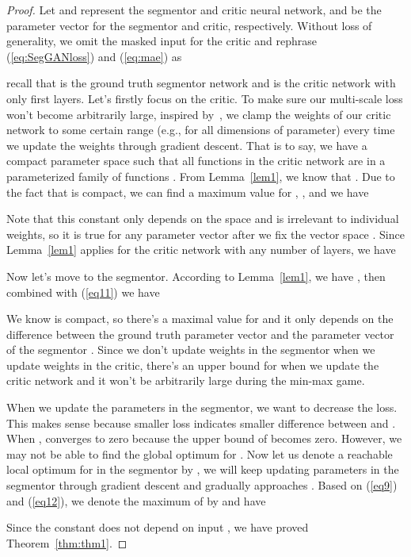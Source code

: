 \documentclass[twocolumn]{svjour3}
\begin{document}
\begin{proof}
Let  and  represent the segmentor and critic neural network,  and  be the parameter vector for the segmentor and critic, respectively. Without loss of generality, we omit the masked input for the critic and rephrase (\ref{eq:SegGANloss}) and (\ref{eq:mae}) as

recall that  is the ground truth segmentor network and  is the critic network with only first  layers. Let's firstly focus on the critic. To make sure our multi-scale loss won't become arbitrarily large, inspired by~\cite{arjovsky2017wasserstein}, we clamp the weights of our critic network to some certain range (e.g.,  for all dimensions of parameter) every time we update the weights through gradient descent. That is to say, we have a compact parameter space  such that all functions in the critic network are in a parameterized family of functions . From Lemma~\ref{lem1}, we know that . Due to the fact that  is compact, we can find a maximum value for , , and we have

Note that this constant  only depends on the space  and is irrelevant to individual weights, so it is true for any parameter vector  after we fix the vector space . Since Lemma~\ref{lem1} applies for the critic network with any number of layers, we have


Now let's move to the segmentor. According to Lemma~\ref{lem1}, we have , then combined with (\ref{eq11}) we have

We know  is compact, so there's a maximal value for  and it only depends on the difference between the ground truth parameter vector  and the parameter vector of the segmentor . Since we don't update weights in the segmentor when we update weights in the critic, there's an upper bound for  when we update the critic network and it won't be arbitrarily large during the min-max game.

When we update the parameters in the segmentor, we want to decrease the loss. This makes sense because smaller loss indicates smaller difference between  and . When ,  converges to zero because the upper bound of  becomes zero. However, we may not be able to find the global optimum for . Now let us denote a reachable local optimum for  in the segmentor by , we will keep updating parameters in the segmentor through gradient descent and gradually approaches . Based on (\ref{eq9}) and (\ref{eq12}), we denote the maximum of  by  and have

Since the constant  does not depend on input , we have proved Theorem~\ref{thm:thm1}.
\end{proof}
\end{document}
